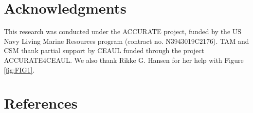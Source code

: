 \documentclass[preprint]{JASA}
\begin{document}
\section{\label{sec:6} Acknowledgments}

This research was conducted under the ACCURATE project, funded by the US Navy Living Marine Resources program (contract no. N3943019C2176). TAM and CSM thank partial support by CEAUL funded through the project ACCURATE4CEAUL. We also thank Rikke G. Hansen for her help with Figure \ref{fig:FIG1}.

\section{\label{sec:7} References}


\end{document}
